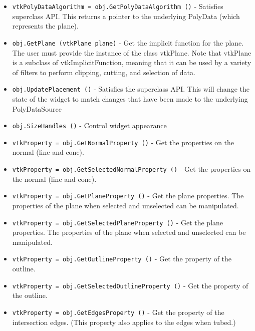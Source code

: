 \begin{itemize}
\item  \verb|vtkPolyDataAlgorithm = obj.GetPolyDataAlgorithm ()| -  Satisfies superclass API.  This returns a pointer to the underlying
 PolyData (which represents the plane).

\item  \verb|obj.GetPlane (vtkPlane plane)| -  Get the implicit function for the plane. The user must provide the
 instance of the class vtkPlane. Note that vtkPlane is a subclass of
 vtkImplicitFunction, meaning that it can be used by a variety of filters
 to perform clipping, cutting, and selection of data.

\item  \verb|obj.UpdatePlacement ()| -  Satisfies the superclass API.  This will change the state of the widget
 to match changes that have been made to the underlying PolyDataSource

\item  \verb|obj.SizeHandles ()| -  Control widget appearance

\item  \verb|vtkProperty = obj.GetNormalProperty ()| -  Get the properties on the normal (line and cone).

\item  \verb|vtkProperty = obj.GetSelectedNormalProperty ()| -  Get the properties on the normal (line and cone).

\item  \verb|vtkProperty = obj.GetPlaneProperty ()| -  Get the plane properties. The properties of the plane when selected
 and unselected can be manipulated.

\item  \verb|vtkProperty = obj.GetSelectedPlaneProperty ()| -  Get the plane properties. The properties of the plane when selected
 and unselected can be manipulated.

\item  \verb|vtkProperty = obj.GetOutlineProperty ()| -  Get the property of the outline.

\item  \verb|vtkProperty = obj.GetSelectedOutlineProperty ()| -  Get the property of the outline.

\item  \verb|vtkProperty = obj.GetEdgesProperty ()| -  Get the property of the intersection edges. (This property also
 applies to the edges when tubed.)

\end{itemize}
